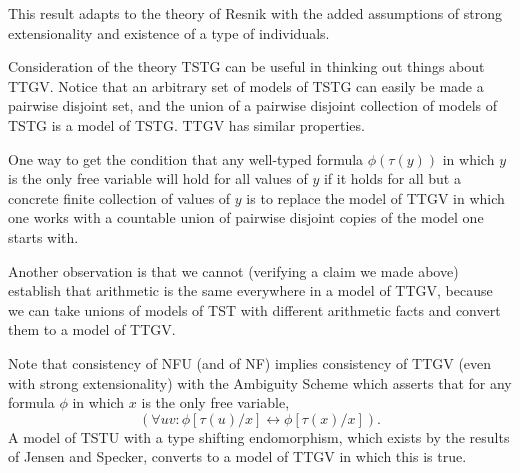 \documentclass[12pt]{article}
\begin{document}
This result adapts to the theory of Resnik with the added assumptions of strong extensionality and existence of a type of individuals.

Consideration of the theory TSTG can be useful in thinking out things about TTGV.  Notice that
an arbitrary set of models of TSTG can easily be made a pairwise disjoint set, and the union of a pairwise disjoint collection of models of TSTG is a model of TSTG.  TTGV has similar properties.

One way to get the condition that any well-typed formula $\phi(\tau(y))$ in which $y$ is the only free variable
will hold for all values of $y$ if it holds for all but a concrete finite collection of values of $y$ is to replace the model of TTGV in which one works with a countable union of pairwise disjoint copies of the model one starts with.

Another observation is that we cannot (verifying a claim we made above) establish that arithmetic is the same everywhere in a model of TTGV, because we can take unions of models of TST with different arithmetic facts and convert them to a model of TTGV.

Note that consistency of NFU (and of NF) implies consistency of TTGV (even with strong extensionality) with the Ambiguity Scheme which asserts that for any  formula $\phi$ in which $x$ is the only free variable, $$(\forall uv:\phi[\tau(u)/x]\leftrightarrow \phi[\tau(x)/x]).$$  A model of TSTU with a type shifting endomorphism, which exists by the results of Jensen and Specker, converts to a model of TTGV in which this is true.
\end{document}
